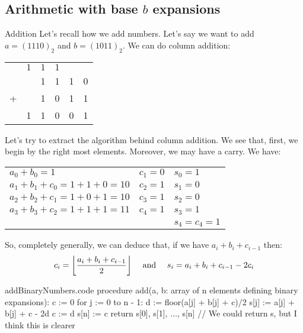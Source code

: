 \documentclass[a4paper]{article}
\begin{document}
\subsection{Arithmetic with base $b$ expansions}
\begin{parag}{Addition}
    Let's recall how we add numbers. Let's say we want to add $a = \left(1110\right)_2$ and $b = \left(1011\right)_2$. We can do column addition: 
    \begin{center}
    \begin{tabular}{r@{\,}r@{\,}r@{\,}r@{\,}r@{\,}r@{\,}}
        & \tiny$1$ & \tiny$1$ & \tiny$1$ & &  \\
        & & 1 & 1 & 1 & 0  \\
        + & & 1 & 0 & 1 & 1  \\
        \hline
        & 1 & 1 & 0 & 0 & 1
    \end{tabular}
    \end{center}
    
    Let's try to extract the algorithm behind column addition. We see that, first, we begin by the right most elements. Moreover, we may have a carry. We have:
    \begin{center}
    \begin{tabular}{lll}
        $a_0 + b_0 = 1$ & $c_1 = 0$ & $s_0 = 1$ \\
        $a_1 + b_1 + c_0 = 1 + 1 + 0 = 10$ & $c_2 = 1$ & $s_1 = 0$ \\
        $a_2 + b_2 + c_1 = 1 + 0 + 1 = 10$ & $c_3 = 1$ & $s_2 = 0$ \\
        $a_3 + b_3 + c_2 = 1 + 1 + 1 = 11$ & $c_4 = 1$ & $s_3 = 1$ \\
                                             & & $s_4 = c_4 = 1$ 
    \end{tabular}
    \end{center}
    
    So, completely generally, we can deduce that, if we have $a_i + b_i + c_{i-1}$ then: 
    \[c_{i} = \left\lfloor \frac{a_i + b_i + c_{i-1}}{2} \right\rfloor \mathspace \text{ and } \mathspace s_i = a_i + b_i + c_{i-1} - 2c_{i} \]
    
\end{parag}

\begin{filecontents*}[overwrite]{addBinaryNumbers.code}
    procedure add(a, b: array of n elements defining binary expansions):
    c := 0
    for j := 0 to n - 1:
        d := floor(a[j] + b[j] + c)/2
        s[j] := a[j] + b[j] + c - 2d
        c := d
    s[n] := c
    return {s[0], s[1], ..., s[n]}  // We could return s, but I think this is clearer
\end{filecontents*}
\end{document}
